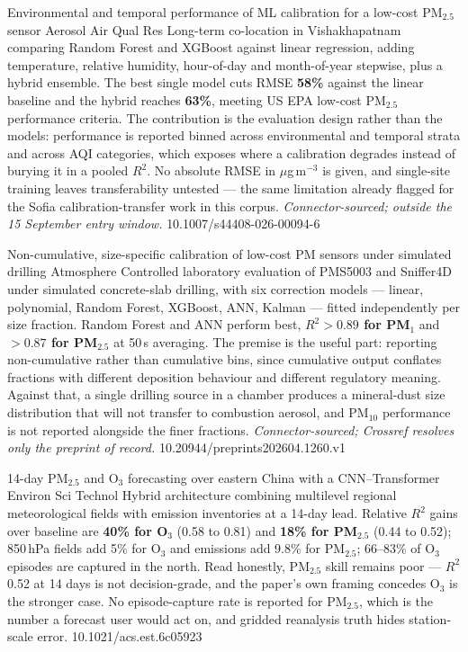 \documentclass[10pt]{article}
\begin{document}
{Environmental and temporal performance of ML calibration for a low-cost PM$_{2.5}$ sensor}
{Aerosol Air Qual Res}
{Long-term co-location in Vishakhapatnam comparing Random Forest and XGBoost against
linear regression, adding temperature, relative humidity, hour-of-day and month-of-year
stepwise, plus a hybrid ensemble. The best single model cuts RMSE \textbf{58\%} against
the linear baseline and the hybrid reaches \textbf{63\%}, meeting US EPA low-cost
PM$_{2.5}$ performance criteria. The contribution is the evaluation design rather than the
models: performance is reported binned across environmental and temporal strata and across
AQI categories, which exposes where a calibration degrades instead of burying it in a
pooled $R^2$. No absolute RMSE in $\mu$g\,m$^{-3}$ is given, and single-site training
leaves transferability untested --- the same limitation already flagged for the Sofia
calibration-transfer work in this corpus.
\textit{Connector-sourced; outside the 15 September entry window.}}
{10.1007/s44408-026-00094-6}

{Non-cumulative, size-specific calibration of low-cost PM sensors under simulated drilling}
{Atmosphere}
{Controlled laboratory evaluation of PMS5003 and Sniffer4D under simulated concrete-slab
drilling, with six correction models --- linear, polynomial, Random Forest, XGBoost, ANN,
Kalman --- fitted independently per size fraction. Random Forest and ANN perform best,
\textbf{$R^2 > 0.89$ for PM$_1$} and \textbf{$> 0.87$ for PM$_{2.5}$} at 50\,s averaging.
The premise is the useful part: reporting non-cumulative rather than cumulative bins,
since cumulative output conflates fractions with different deposition behaviour and
different regulatory meaning. Against that, a single drilling source in a chamber produces
a mineral-dust size distribution that will not transfer to combustion aerosol, and
PM$_{10}$ performance is not reported alongside the finer fractions.
\textit{Connector-sourced; Crossref resolves only the preprint of record.}}
{10.20944/preprints202604.1260.v1}

{14-day PM$_{2.5}$ and O$_3$ forecasting over eastern China with a CNN--Transformer}
{Environ Sci Technol}
{Hybrid architecture combining multilevel regional meteorological fields with emission
inventories at a 14-day lead. Relative $R^2$ gains over baseline are \textbf{40\% for
O$_3$} (0.58 to 0.81) and \textbf{18\% for PM$_{2.5}$} (0.44 to 0.52); 850\,hPa fields add
5\% for O$_3$ and emissions add 9.8\% for PM$_{2.5}$; 66--83\% of O$_3$ episodes are
captured in the north. Read honestly, PM$_{2.5}$ skill remains poor --- $R^2$ 0.52 at
14 days is not decision-grade, and the paper's own framing concedes O$_3$ is the stronger
case. No episode-capture rate is reported for PM$_{2.5}$, which is the number a forecast
user would act on, and gridded reanalysis truth hides station-scale error.}
{10.1021/acs.est.6c05923}
\end{document}

